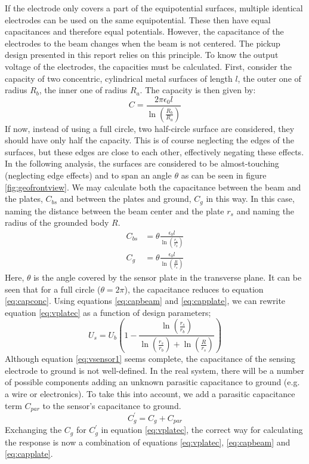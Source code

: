 If the electrode only covers a part of the equipotential surfaces, multiple identical electrodes can be used on the same equipotential. These then have equal capacitances and therefore equal potentials.
However, the capacitance of the electrodes to the beam changes when the beam is not centered. The pickup design presented in this report relies on this principle.
To know the output voltage of the electrodes, the capacities must be calculated.
First, consider the capacity of two concentric, cylindrical metal surfaces of length $l$, the outer one of radius $R_b$, the inner one of radius $R_a$. The capacity is then given by\cite{GriffithsEM}:
\begin{equation}
C = \frac{2\pi\epsilon_0l}{\ln \left(\frac{R_b}{R_a} \right)}
\label{eq:capconc}
\end{equation}
If now, instead of using a full circle, two half-circle surface are considered, they should have only half the capacity. This is of course neglecting the edges of the surfaces, but these edges are close to each other, effectively negating these effects. In the following analysis, the surfaces are considered to be almost-touching (neglecting edge effects) and to span an angle $\theta$ as can be seen in figure \ref{fig:geofrontview}.
We may calculate both the capacitance between the beam and the plates, $C_{bs}$ and between the plates and ground, $C_g$ in this way. In this case, naming the distance between the beam center and the plate $r_s$ and naming the radius of the grounded body $R$.
\begin{align}
C_{bs} &= \theta \frac{\epsilon_0l}{\ln\left(\frac{r_s}{r_b}\right)} \label{eq:capbeam}\\
C_g &= \theta \frac{\epsilon_0l}{\ln\left(\frac{R}{r_s}\right)}
\label{eq:capplate}
\end{align}
Here, $\theta$ is the angle covered by the sensor plate in the transverse plane. It can be seen that for a full circle ($\theta=2\pi$), the capacitance reduces to equation \ref{eq:capconc}.
Using equations \ref{eq:capbeam} and \ref{eq:capplate}, we can rewrite equation \ref{eq:vplatec} as a function of design parameters;
\begin{equation}
U_s = U_b \left(1-\frac{\ln\left(\frac{r_s}{r_b}\right)}{\ln\left(\frac{r_s}{r_b}\right)+\ln\left(\frac{R}{r_s}\right)} \right)
\label{eq:vsensor1}
\end{equation}
Although equation \ref{eq:vsensor1} seems complete, the capacitance of the sensing electrode to ground is not well-defined. In the real system, there will be a number of possible components adding an unknown parasitic capacitance to ground (e.g. a wire or electronics). To take this into account, we add a parasitic capacitance term $C_{par}$ to the sensor's capacitance to ground.
\begin{equation*}
C_g^\prime = C_g + C_{par}
\end{equation*}
Exchanging the $C_g$ for $C_g^\prime$ in equation \ref{eq:vplatec}, the correct way for calculating the response is now a combination of equations \ref{eq:vplatec}, \ref{eq:capbeam} and \ref{eq:capplate}.

